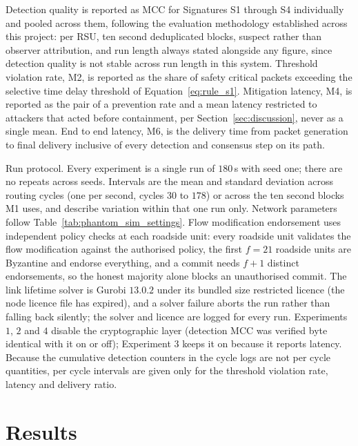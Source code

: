 \documentclass[final,5p,twocolumn]{elsarticle}
\theoremstyle{remark}
\theoremstyle{plain}
\begin{document}
Detection quality is reported as MCC for Signatures S1 through S4
individually and pooled across them, following the evaluation methodology
established across this project: per RSU, ten second deduplicated blocks,
suspect rather than observer attribution, and run length always stated
alongside any figure, since detection quality is not stable across run
length in this system. Threshold violation rate, M2, is reported as the
share of safety critical packets exceeding the selective time delay
threshold of Equation~\eqref{eq:rule_s1}. Mitigation latency, M4, is
reported as the pair of a prevention rate and a mean latency restricted to
attackers that acted before containment, per Section~\ref{sec:discussion},
never as a single mean. End to end latency, M6, is the delivery time from
packet generation to final delivery inclusive of every detection and
consensus step on its path.

Run protocol. Every experiment is a single run of $180$\,s with seed one; there are no repeats across seeds.
Intervals are the mean and standard deviation across routing cycles (one per second, cycles $30$ to $178$) or
across the ten second blocks M1 uses, and describe variation within that one run only. Network
parameters follow Table~\ref{tab:phantom_sim_settings}. Flow modification endorsement
uses independent policy checks at each roadside unit: every roadside unit validates the flow modification against the authorised policy, the
first $f{=}21$ roadside units are Byzantine and endorse everything, and a commit needs $f{+}1$
distinct endorsements, so the honest majority alone blocks an unauthorised commit. The link lifetime
solver is Gurobi $13.0.2$ under its bundled size restricted licence (the node licence file has expired), and a solver failure aborts the run rather than
falling back silently; the solver and licence are logged for every run. Experiments $1$, $2$ and $4$
disable the cryptographic layer (detection MCC was verified byte identical with it on or off); Experiment $3$
keeps it on because it reports latency. Because the cumulative detection counters in the cycle logs are not
per cycle quantities, per cycle intervals are given only for the threshold violation rate, latency and delivery ratio.


\section{Results}
\label{sec:results}

\end{document}
